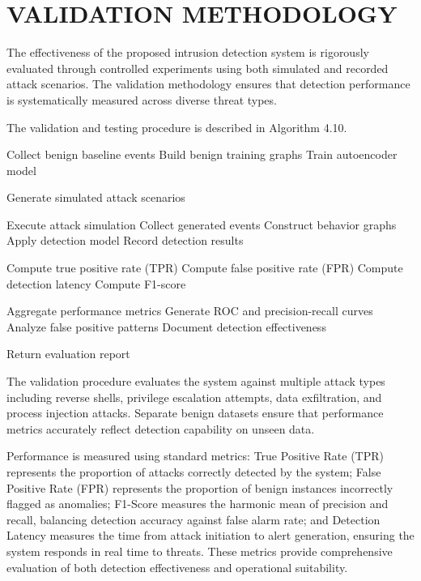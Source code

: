 \section{\uppercase{VALIDATION METHODOLOGY}}

The effectiveness of the proposed intrusion detection system is rigorously evaluated through controlled experiments using both simulated and recorded attack scenarios. The validation methodology ensures that detection performance is systematically measured across diverse threat types.

The validation and testing procedure is described in Algorithm 4.10.

\begin{algorithm}
\caption{System Validation and Testing Methodology}
\begin{algorithmic}[1]

\State Collect benign baseline events
\State Build benign training graphs
\State Train autoencoder model

\State Generate simulated attack scenarios


\State Execute attack simulation
\State Collect generated events
\State Construct behavior graphs
\State Apply detection model
\State Record detection results

\State Compute true positive rate (TPR)
\State Compute false positive rate (FPR)
\State Compute detection latency
\State Compute F1-score

\EndFor

\State Aggregate performance metrics
\State Generate ROC and precision-recall curves
\State Analyze false positive patterns
\State Document detection effectiveness

\State Return evaluation report

\end{algorithmic}
\end{algorithm}

The validation procedure evaluates the system against multiple attack types including reverse shells, privilege escalation attempts, data exfiltration, and process injection attacks. Separate benign datasets ensure that performance metrics accurately reflect detection capability on unseen data.

Performance is measured using standard metrics: True Positive Rate (TPR) represents the proportion of attacks correctly detected by the system; False Positive Rate (FPR) represents the proportion of benign instances incorrectly flagged as anomalies; F1-Score measures the harmonic mean of precision and recall, balancing detection accuracy against false alarm rate; and Detection Latency measures the time from attack initiation to alert generation, ensuring the system responds in real time to threats. These metrics provide comprehensive evaluation of both detection effectiveness and operational suitability.




